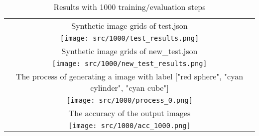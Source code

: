 \begin{table}[ht]
    \centering
    \begin{tabular}{|c|}
        \hline
        Synthetic image grids of test.json \\
        \texttt{[image: src/1000/test\_results.png]} \\
        \hline
        Synthetic image grids of new\_test.json \\
        \texttt{[image: src/1000/new\_test\_results.png]} \\
        \hline
        The process of generating a image with label ["red sphere", "cyan cylinder", "cyan cube"] \\
        \texttt{[image: src/1000/process\_0.png]} \\
        \hline
        The accuracy of the output images \\
        \texttt{[image: src/1000/acc\_1000.png]} \\
        \hline
    \end{tabular}
    \caption{Results with 1000 training/evaluation steps}
    \label{tab:1000_steps}
\end{table}



